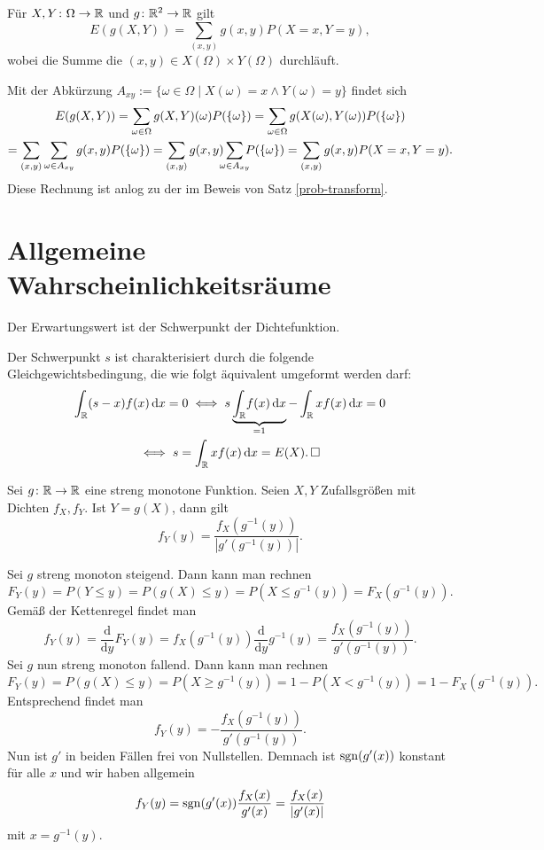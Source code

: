 \begin{Satz}
Für $X,Y\colon\Omega\to\mathbb R$ und $g\colon\mathbb R^2\to\mathbb R$ gilt
\[E(g(X,Y)) = \sum_{(x,y)} g(x,y)P(X=x,Y=y),\]
wobei die Summe die $(x,y)\in X(\Omega)\times Y(\Omega)$ durchläuft.
\end{Satz}
\begin{Beweis}
Mit der Abkürzung $A_{xy}:=\{\omega\in\Omega\mid X(\omega)=x\land Y(\omega)=y\}$
findet sich%
\begin{gather*}
E(g(X,Y)) = \sum_{\omega\in\Omega} g(X,Y)(\omega)P(\{\omega\})
= \sum_{\omega\in\Omega} g(X(\omega),Y(\omega))P(\{\omega\})\\
= \sum_{(x,y)}\sum_{\omega\in A_{xy}} g(x,y)P(\{\omega\})
= \sum_{(x,y)}g(x,y)\sum_{\mathclap{\omega\in A_{xy}}} P(\{\omega\})
= \sum_{(x,y)}g(x,y)P(X=x,Y=y).
\end{gather*}
Diese Rechnung ist anlog zu der im Beweis von Satz \ref{prob-transform}.\,\qedsymbol
\end{Beweis}

\newpage
\section{Allgemeine Wahrscheinlichkeitsräume}

\begin{Satz}
Der Erwartungswert ist der Schwerpunkt der Dichtefunktion.
\end{Satz}
\begin{Beweis} Der Schwerpunkt $s$ ist charakterisiert durch die
folgende Gleichgewichtsbedingung, die wie folgt äquivalent
umgeformt werden darf:
\begin{gather*}
\int_\mathbb R (s-x)f(x)\,\mathrm dx = 0
\iff s\underbrace{\int_\mathbb R\! f(x)\,\mathrm dx}_{=1}
- \int_\mathbb R xf(x)\,\mathrm dx = 0\\
\iff s = \int_\mathbb R xf(x)\,\mathrm dx = E(X).\,\square
\end{gather*}
\end{Beweis}

\begin{Satz}\label{rv-transform-pdf}
Sei $g\colon\mathbb R\to\mathbb R$ eine streng monotone Funktion. Seien
$X,Y$ Zufallsgrößen mit Dichten $f_X,f_Y$. Ist $Y=g(X)$,
dann gilt
\[f_Y(y) = \frac{f_X(g^{-1}(y))}{|g'(g^{-1}(y))|}.\]
\end{Satz}
 Sei $g$ streng monoton steigend. Dann kann man rechnen
\[F_Y(y) = P(Y\le y) = P(g(X)\le y) = P(X\le g^{-1}(y)) = F_X(g^{-1}(y)).\]
Gemäß der Kettenregel findet man
\[f_Y(y) = \frac{\mathrm d}{\mathrm dy}F_Y(y)
= f_X(g^{-1}(y))\frac{\mathrm d}{\mathrm dy}g^{-1}(y) = \frac{f_X(g^{-1}(y))}{g'(g^{-1}(y))}.\]
Sei $g$ nun streng monoton fallend. Dann kann man rechnen
\[F_Y(y) = P(g(X)\le y) = P(X\ge g^{-1}(y)) = 1 - P(X < g^{-1}(y))
= 1 - F_X(g^{-1}(y)).\]
Entsprechend findet man
\[f_Y(y) = -\frac{f_X(g^{-1}(y))}{g'(g^{-1}(y))}.\]
Nun ist $g'$ in beiden Fällen frei von Nullstellen. Demnach ist
$\operatorname{sgn}(g'(x))$ konstant für alle $x$ und wir haben allgemein
\[f_Y(y) = \operatorname{sgn}(g'(x))\frac{f_X(x)}{g'(x)} = \frac{f_X(x)}{|g'(x)|}\]
mit $x=g^{-1}(y)$.\;\qedsymbol


